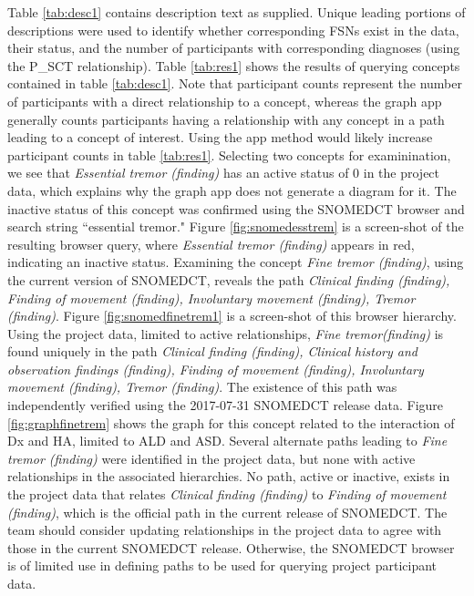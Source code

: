 \documentclass[10pt, letterpaper]{article}
\begin{document}
\begin{spacing}{1.0}
Table \ref{tab:desc1} contains description text as supplied.  Unique leading portions of descriptions were used to identify whether corresponding FSNs exist in the data, their status, and the number of participants with corresponding diagnoses (using the P\_SCT relationship).  Table \ref{tab:res1} shows the results of querying concepts contained in table \ref{tab:desc1}.  Note that participant counts represent the number of participants with a direct relationship to a concept, whereas the graph app generally counts participants having a relationship with any concept in a path leading to a concept of interest.  Using the app method would likely increase participant counts in table \ref{tab:res1}.  Selecting two concepts for examinination, we see that \textit{Essential tremor (finding)} has an active status of 0 in the project data, which explains why the graph app does not generate a diagram for it.  The inactive status of this concept was confirmed using the SNOMEDCT browser and search string ``essential tremor."  Figure \ref{fig:snomedesstrem} is a screen-shot of the resulting browser query, where \textit{Essential tremor (finding)} appears in red, indicating an inactive status.  Examining the concept \textit{Fine tremor (finding)}, using the current version of SNOMEDCT, reveals the path \textit{Clinical finding (finding), Finding of movement (finding), Involuntary movement (finding), Tremor (finding)}.  Figure \ref{fig:snomedfinetrem1} is a screen-shot of this browser hierarchy.  Using the project data, limited to active relationships, \textit{Fine tremor(finding)} is found uniquely in the path \textit{Clinical finding (finding), Clinical history and observation findings (finding), Finding of movement (finding), Involuntary movement (finding), Tremor (finding)}.  The existence of this path was independently verified using the 2017-07-31 SNOMEDCT release data.  Figure \ref{fig:graphfinetrem} shows the graph for this concept related to the interaction of Dx and HA, limited to ALD and ASD.  Several alternate paths leading to \textit{Fine tremor (finding)} were identified in the project data, but none with active relationships in the associated hierarchies.  No path, active or inactive, exists in the project data that relates \textit{Clinical finding (finding)} to \textit{Finding of movement (finding)}, which is the official path in the current release of SNOMEDCT.  The team should consider updating relationships in the project data to agree with those in the current SNOMEDCT release.  Otherwise, the SNOMEDCT browser is of limited use in defining paths to be used for querying project participant data. 


\end{spacing}
\end{document}
